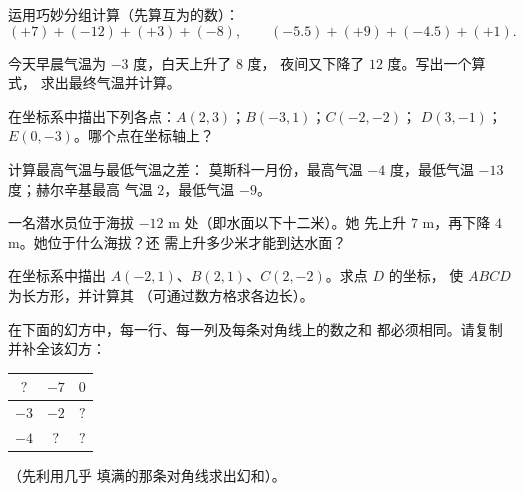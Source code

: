 \begin{exercise}[$\star$]\label{exo:g7:negatives:6}
运用巧妙分组计算（先算互为的数）：
\[
(+7) + (-12) + (+3) + (-8), \qquad
(-5.5) + (+9) + (-4.5) + (+1).
\]
\end{exercise}

\begin{exercise}[$\star$]\label{exo:g7:negatives:7}
今天早晨气温为 $-3$ 度，白天上升了 $8$ 度，
夜间又下降了 $12$ 度。写出一个算式，
求出最终气温并计算。
\end{exercise}

\begin{exercise}[$\star$]\label{exo:g7:negatives:8}
在坐标系中描出下列各点：$A(2, 3)$；$B(-3, 1)$；$C(-2, -2)$；
$D(3, -1)$；$E(0, -3)$。哪个点在坐标轴上？
\end{exercise}

\begin{exercise}[$\star\star$]\label{exo:g7:negatives:9}
计算最高气温与最低气温之差：
莫斯科一月份，最高气温 $-4$ 度，最低气温 $-13$ 度；赫尔辛基最高
气温 $2$，最低气温 $-9$。
\end{exercise}

\begin{exercise}[$\star\star$]\label{exo:g7:negatives:10}
一名潜水员位于海拔 $-12$ m 处（即水面以下十二米）。她
先上升 $7$ m，再下降 $4$ m。她位于什么海拔？还
需上升多少米才能到达水面？
\end{exercise}

\begin{exercise}[$\star\star$]\label{exo:g7:negatives:11}
在坐标系中描出 $A(-2, 1)$、$B(2, 1)$、$C(2, -2)$。求点 $D$ 的坐标，
使 $ABCD$ 为长方形，并计算其
（可通过数方格求各边长）。
\end{exercise}

\begin{exercise}[$\star\star\star$]\label{exo:g7:negatives:12}
在下面的幻方中，每一行、每一列及每条对角线上的数之和
都必须相同。请复制并补全该幻方：
\begin{center}
\renewcommand{\arraystretch}{1.4}
\begin{tabular}{|c|c|c|}
\hline
$?$ & $-7$ & $0$ \\
\hline
$-3$ & $-2$ & $?$ \\
\hline
$-4$ & $?$ & $?$ \\
\hline
\end{tabular}
\end{center}
（先利用几乎
填满的那条对角线求出幻和）。
\end{exercise}

